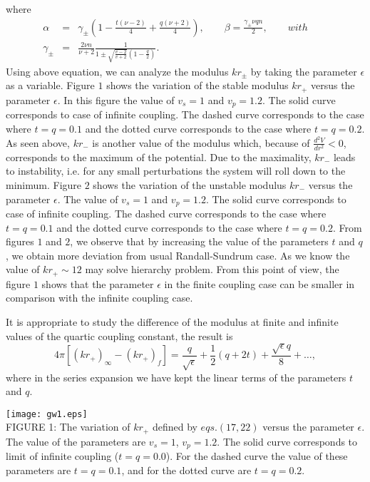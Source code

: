 \documentclass[12pt]{article}
\begin{document}
where
\begin{eqnarray}
\alpha&=&\gamma_{\pm}(1-\frac{t(\nu-2)}{4}+\frac{q(\nu+2)}{4}),\qquad
\beta=
\frac{\gamma_{\pm}\nu q n}{2},\qquad with \qquad \nonumber\\
\gamma_{\pm}&=&\frac{2\nu
n}{\nu+2}\frac{1}{1\pm\sqrt{\frac{v-2}{v+2}}(1-\frac{q}{2})}.
\end{eqnarray}
Using above equation, we can analyze the modulus $kr_{\pm}$ by taking the parameter $\epsilon$ as a variable. Figure $1$ shows the variation of the stable modulus $kr_{+}$ versus the
parameter $\epsilon$. In this figure the value of $v_s=1$ and
$v_p=1.2$. The solid curve corresponds to case of infinite coupling.
The dashed curve corresponds to the case where $t=q=0.1$ and the
dotted curve corresponds to the case where $t=q=0.2$. As seen above, $kr_{-}$ is another value of the modulus which, because of $\frac{d^{2}V}{dr^{2}}<0$, corresponds to the maximum of the potential. Due to the maximality, $kr_{-}$ leads to instability, i.e. for any small perturbations the system will roll down to the minimum. Figure $2$ shows the variation of the unstable modulus $kr_{-}$ versus the parameter $\epsilon$. The value of $v_s=1$ and
$v_p=1.2$. The solid curve corresponds to case of infinite coupling.
The dashed curve corresponds to the case where $t=q=0.1$ and the
dotted curve corresponds to the case where $t=q=0.2$. From figures $1$ and $2$, we observe that by increasing the value of the parameters $t$ and $q$, we obtain more deviation from usual Randall-Sundrum case. As we know the value of $kr_{+}\sim12$ may solve hierarchy problem. From this point of view, the figure $1$ shows that the parameter $\epsilon$ in the finite coupling case can be smaller in comparison with the infinite coupling case.


It is appropriate to study the difference of the modulus at finite
and infinite values of the quartic coupling constant, the result is
\begin{equation}
4\pi
[(kr_+)_\infty-(kr_+)_f]=\frac{q}{\sqrt{\epsilon}}+\frac{1}{2}(q+2t)+
\frac{\sqrt{\epsilon}q}{8}+\ldots,
\end{equation}
where in the series expansion we have kept the linear terms of the
parameters $t$ and $q$.\\


\begin{center}
  \texttt{[image: gw1.eps]}\\
  {\small {FIGURE 1: The variation of $kr_+$ defined by $eqs.(17,22)$ versus the
parameter $\epsilon$. The value of the parameters are
$v_s=1$, $v_p=1.2$. The solid curve corresponds to limit of
infinite coupling ($t=q=0.0$). For the dashed curve the value of
these parameters are $t=q=0.1$, and for the dotted curve are
$t=q=0.2$.}}\\
\end{center}
\end{document}
